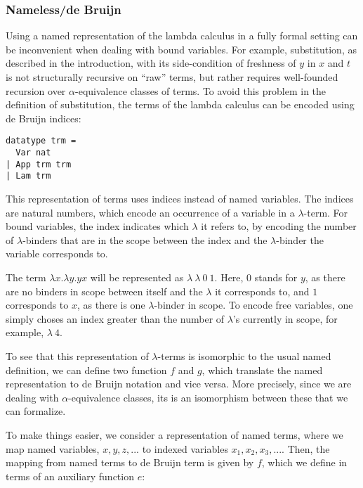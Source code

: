 \documentclass[a4paper, 12pt, twoside]{style/ociamthesis}
\theoremstyle{plain}
\theoremstyle{definition}
\newtheorem{Example}{Example}[chapter]
\theoremstyle{remark}
\renewenvironment{Example}{\begin{OldExample}\begin{mdframed}[style=example, linecolor=yellow]}{\end{mdframed}\end{OldExample}}
\begin{document}
\subsubsection{Nameless/de Bruijn}\label{namelessde-bruijn}

Using a named representation of the lambda calculus in a fully formal
setting can be inconvenient when dealing with bound variables. For
example, substitution, as described in the introduction, with its
side-condition of freshness of \(y\) in \(x\) and \(t\) is not
structurally recursive on ``raw'' terms, but rather requires
well-founded recursion over \(\alpha\)-equivalence classes of terms. To
avoid this problem in the definition of substitution, the terms of the
lambda calculus can be encoded using de Bruijn indices:

\begin{verbatim}
datatype trm =
  Var nat
| App trm trm
| Lam trm
\end{verbatim}

This representation of terms uses indices instead of named variables.
The indices are natural numbers, which encode an occurrence of a
variable in a \(\lambda\)-term. For bound variables, the index indicates
which \(\lambda\) it refers to, by encoding the number of
\(\lambda\)-binders that are in the scope between the index and the
\(\lambda\)-binder the variable corresponds to.

\begin{Example}

The term \(\lambda x.\lambda y. yx\) will be represented as
\(\lambda\ \lambda\ 0\ 1\). Here, 0 stands for \(y\), as there are no
binders in scope between itself and the \(\lambda\) it corresponds to,
and \(1\) corresponds to \(x\), as there is one \(\lambda\)-binder in
scope. To encode free variables, one simply choses an index greater than
the number of \(\lambda\)'s currently in scope, for example,
\(\lambda\ 4\).

\end{Example}

To see that this representation of \(\lambda\)-terms is isomorphic to
the usual named definition, we can define two function \(f\) and \(g\),
which translate the named representation to de Bruijn notation and vice
versa. More precisely, since we are dealing with \(\alpha\)-equivalence
classes, its is an isomorphism between these that we can formalize.

To make things easier, we consider a representation of named terms,
where we map named variables, \(x, y, z,...\) to indexed variables
\(x_1,x_2,x_3,...\). Then, the mapping from named terms to de Bruijn
term is given by \(f\), which we define in terms of an auxiliary
function \(e\):
\end{document}

